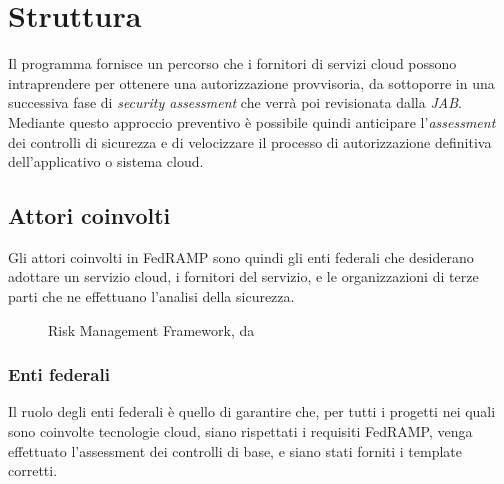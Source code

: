 \documentclass[../main.tex]{subfiles}
\begin{document}
\section{Struttura}
Il programma fornisce un percorso che i fornitori di servizi cloud possono intraprendere per ottenere una autorizzazione provvisoria, da sottoporre in una successiva fase di \textit{security assessment} che verrà poi revisionata dalla \textit{JAB}.
Mediante questo approccio preventivo è possibile quindi anticipare l'\textit{assessment} dei controlli di sicurezza e di velocizzare il processo di autorizzazione definitiva dell'applicativo o sistema cloud.


\vfill
\subsection{Attori coinvolti}
Gli attori coinvolti in FedRAMP sono quindi gli enti federali che desiderano adottare un servizio cloud, i fornitori del servizio, e le organizzazioni di terze parti che ne effettuano l'analisi della sicurezza.

\begin{figure}[H]
\centering
{}
\caption{Risk Management Framework, da \cite{} }\label{fig:fedrampactors}
\end{figure}



\subsubsection{Enti federali}
Il ruolo degli enti federali è quello di garantire che, per tutti i progetti nei quali sono coinvolte tecnologie cloud, siano rispettati i requisiti FedRAMP, venga effettuato l'assessment dei controlli di base, e siano stati forniti i template corretti.
\end{document}
